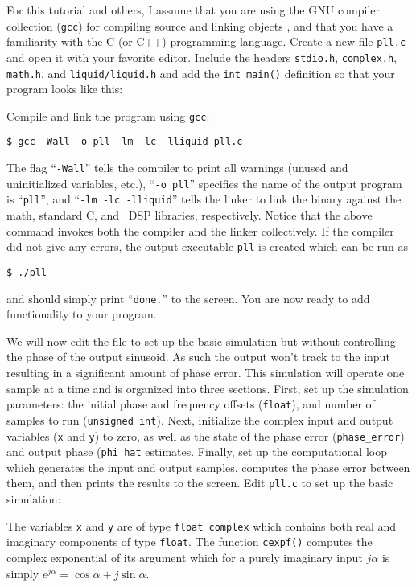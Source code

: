 For this tutorial and others, I assume that you are using the GNU
compiler collection ({\tt gcc}) for compiling source and linking objects
\cite{gcc:web},
and that you have a familiarity with the C (or C++) programming
language.
Create a new file {\tt pll.c} and open it with your favorite editor.
Include the headers {\tt stdio.h}, {\tt complex.h}, {\tt math.h}, and
{\tt liquid/liquid.h} and add the {\tt int main()} definition
so that your program looks like this:
%

%
Compile and link the program using {\tt gcc}:
%
\begin{Verbatim}[fontsize=\small]
    $ gcc -Wall -o pll -lm -lc -lliquid pll.c
\end{Verbatim}
%
The flag ``{\tt -Wall}'' tells the compiler to print all warnings
(unused and uninitialized variables, etc.),
``{\tt -o pll}'' specifies the name of the output program is
``{\tt pll}'', and
``{\tt -lm -lc -lliquid}'' tells the linker to link the binary against
the math, standard C, and \liquid\ DSP libraries, respectively.
Notice that the above command invokes both the compiler and the linker
collectively.
%
If the compiler did not give any errors, the output executable {\tt pll}
is created which can be run as
\begin{Verbatim}[fontsize=\small]
    $ ./pll
\end{Verbatim}
%
and should simply print ``{\tt done.}'' to the screen.
You are now ready to add functionality to your program.

We will now edit the file to set up the basic simulation but without
controlling the phase of the output sinusoid.
As such the output won't track to the input resulting in a significant
amount of phase error.
This simulation will operate one sample at a time and is organized into
three sections.
First, set up the simulation parameters: the initial phase and frequency
offsets ({\tt float}),
and number of samples to run ({\tt unsigned int}).
Next, initialize the complex input and output variables
({\tt x} and {\tt y}) to zero,
as well as the state of the phase error ({\tt phase\_error})
and output phase ({\tt phi\_hat} estimates.
Finally, set up the computational loop which generates the input and
output samples, computes the phase error between them, and then prints
the results to the screen.
%
Edit {\tt pll.c} to set up the basic simulation:
%

%
The variables {\tt x} and {\tt y} are of type {\tt float complex} which
contains both real and imaginary components of type {\tt float}.
The function {\tt cexpf()} computes the complex exponential of its
argument which for a purely imaginary input $j\alpha$ is simply
$e^{j\alpha} = \cos\alpha + j\sin\alpha$.

